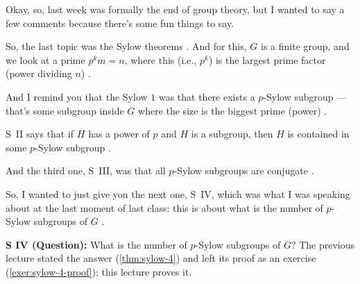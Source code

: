 \begin{speech}[00:00:00 - 00:01:49]
Okay, so, last week was formally the end of group theory, but I wanted to say a few comments because there's some fun things to say.

So, the last topic was the Sylow theorems . And for this, $G$ is a finite group, and we look at a prime $p^k m = n$, where this (i.e., $p^k$) is the largest prime factor (power dividing $n$) .

And I remind you that the Sylow $1$ was that there exists a $p$-Sylow subgroup --- that's some subgroup inside $G$ where the size is the biggest prime (power) .

S~II says that if $H$ has a power of $p$ and $H$ is a subgroup, then $H$ is contained in some $p$-Sylow subgroup .

And the third one, S~III, was that all $p$-Sylow subgroups are conjugate .

So, I wanted to just give you the next one, S~IV, which was what I was speaking about at the last moment of last class: this is about what is the number of $p$-Sylow subgroups of $G$ .
\end{speech}

\begin{content}

\textbf{S IV (Question):} What is the number of $p$-Sylow subgroups of $G$? The previous lecture stated the answer (\cref{thm:sylow-4}) and left its proof as an exercise (\cref{exer:sylow-4-proof}); this lecture proves it.
\end{content}

